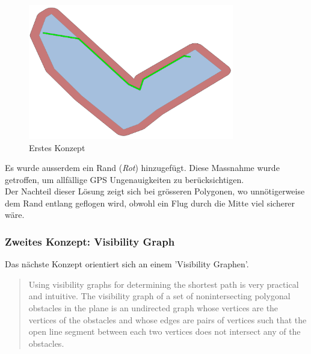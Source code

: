 \begin{figure}[H]
	\centering
	\includegraphics[width=0.8\textwidth]{images/routing/firstSolution.png}
	\caption{Erstes Konzept}
	\label{fig:first-concet-routing}
\end{figure}
Es wurde ausserdem ein Rand (\textit{Rot}) hinzugefügt. Diese Massnahme wurde getroffen, um allfällige GPS Ungenauigkeiten zu berücksichtigen.\\

Der Nachteil dieser Lösung zeigt sich bei grösseren Polygonen, wo unnötigerweise dem Rand entlang geflogen wird, obwohl ein Flug durch die Mitte viel sicherer wäre.
\newpage
\subsubsection{Zweites Konzept: Visibility Graph}
Das nächste Konzept orientiert sich an einem 'Visibility Graphen'. 
\cite[]{IEEEPaper} 

\blockquote{Using visibility graphs for determining the shortest path is very practical and intuitive. The visibility graph of a set of nonintersecting polygonal obstacles in the plane is an undirected graph whose vertices are the vertices of the obstacles and whose edges are pairs of vertices such that the open line segment between each two vertices does not intersect any of the obstacles.}


